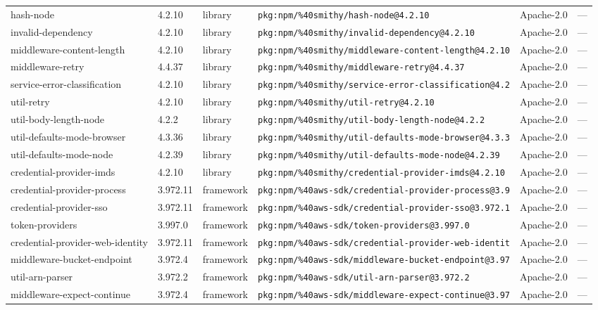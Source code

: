 \documentclass[11pt]{article}
\begin{document}
\begin{longtable}{|l|l|l|p{2.2cm}|l|p{4cm}|}
hash-node & 4.2.10 & library & \texttt{pkg:npm/\%40smithy/hash-node@4.2.10} & Apache-2.0 & — \\
invalid-dependency & 4.2.10 & library & \texttt{pkg:npm/\%40smithy/invalid-dependency@4.2.10} & Apache-2.0 & — \\
middleware-content-length & 4.2.10 & library & \texttt{pkg:npm/\%40smithy/middleware-content-length@4.2.10} & Apache-2.0 & — \\
middleware-retry & 4.4.37 & library & \texttt{pkg:npm/\%40smithy/middleware-retry@4.4.37} & Apache-2.0 & — \\
service-error-classification & 4.2.10 & library & \texttt{pkg:npm/\%40smithy/service-error-classification@4.2} & Apache-2.0 & — \\
util-retry & 4.2.10 & library & \texttt{pkg:npm/\%40smithy/util-retry@4.2.10} & Apache-2.0 & — \\
util-body-length-node & 4.2.2 & library & \texttt{pkg:npm/\%40smithy/util-body-length-node@4.2.2} & Apache-2.0 & — \\
util-defaults-mode-browser & 4.3.36 & library & \texttt{pkg:npm/\%40smithy/util-defaults-mode-browser@4.3.3} & Apache-2.0 & — \\
util-defaults-mode-node & 4.2.39 & library & \texttt{pkg:npm/\%40smithy/util-defaults-mode-node@4.2.39} & Apache-2.0 & — \\
credential-provider-imds & 4.2.10 & library & \texttt{pkg:npm/\%40smithy/credential-provider-imds@4.2.10} & Apache-2.0 & — \\
credential-provider-process & 3.972.11 & framework & \texttt{pkg:npm/\%40aws-sdk/credential-provider-process@3.9} & Apache-2.0 & — \\
credential-provider-sso & 3.972.11 & framework & \texttt{pkg:npm/\%40aws-sdk/credential-provider-sso@3.972.1} & Apache-2.0 & — \\
token-providers & 3.997.0 & framework & \texttt{pkg:npm/\%40aws-sdk/token-providers@3.997.0} & Apache-2.0 & — \\
credential-provider-web-identity & 3.972.11 & framework & \texttt{pkg:npm/\%40aws-sdk/credential-provider-web-identit} & Apache-2.0 & — \\
middleware-bucket-endpoint & 3.972.4 & framework & \texttt{pkg:npm/\%40aws-sdk/middleware-bucket-endpoint@3.97} & Apache-2.0 & — \\
util-arn-parser & 3.972.2 & framework & \texttt{pkg:npm/\%40aws-sdk/util-arn-parser@3.972.2} & Apache-2.0 & — \\
middleware-expect-continue & 3.972.4 & framework & \texttt{pkg:npm/\%40aws-sdk/middleware-expect-continue@3.97} & Apache-2.0 & — \\

\end{longtable}
\end{document}
